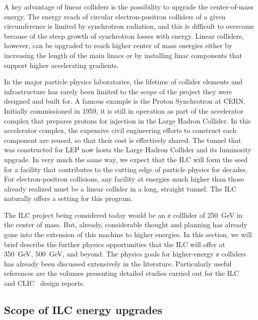 


A key advantage of linear colliders is the possibility to upgrade
the center-of-mass energy.  The energy reach of circular electron-positron
colliders of a given circumference is limited by synchrotron
radiation, and this is difficult to overcome because of the steep
growth of synchrotron losses with energy.  Linear colliders, however,
can be upgraded to reach higher center of mass energies either by
increasing the length of the main linacs or by installing linac components
that support higher accelerating gradients.  


In the major particle physics laboratories, the lifetime of collider elements
and infrastructure has rarely been  limited to the scope of the project they were
designed and built for. A famous example is the Proton Synchrotron at CERN.
Initially commissioned in 1959, it is still in operation as
part of the accelerator complex that prepares protons for injection in the
Large Hadron Collider. In this accelerator complex, the  expensive civil engineering
efforts to construct each component are reused, so that their cost is effectively shared. The tunnel
that was constructed for LEP now hosts the Large Hadron Collider and its
luminosity upgrade. In very much the same way, we
expect  that the ILC will  form the seed for a facility that contributes to the
cutting edge of particle physics for decades.  For electron-positron
collisions, 
any facility at energies much higher than
those already realized must be a linear collider in a long, straight
tunnel.   The ILC naturally offers a setting for this program.



The ILC project  being considered today would be an $\ee$ colllider of
250~GeV in the center of mass. But, already,  considerable thought and
planning has already gone into the extension of this machine to higher energies.
In this section, we will brief describe the further physics
opportunities that the ILC will offer at 350~GeV, 500~GeV, and beyond.
The physics goals for higher-energy $\ee$ colliders has already been 
discussed extensively in the literature. Particularly useful
references are the volumes presenting  detailed studies carried out for 
the ILC~\cite{Fujii:2015jha,Baer:2013cma}
and CLIC~\cite{Linssen:2012hp,deBlas:2018mhx,Roloff:2018dqu} design reports. 




\subsection{Scope of ILC energy upgrades}
\label{subsec:highE:tech}


